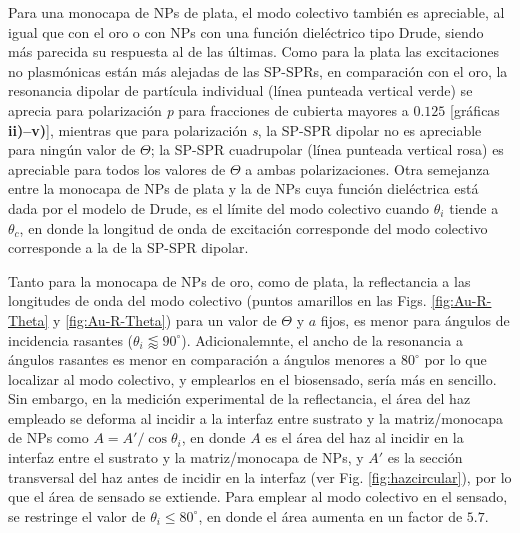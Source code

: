 Para una monocapa de NPs de plata, el modo colectivo también es apreciable, al igual que con el oro o con NPs con una función dieléctrico tipo Drude, siendo más parecida su respuesta al de las últimas. Como para la plata las excitaciones no plasmónicas están más alejadas de las SP-SPRs, en comparación con el oro, la resonancia dipolar de partícula individual (línea punteada vertical verde) se aprecia para polarización \emph{p} para fracciones de cubierta mayores a $0.125$ [gráficas \textbf{ii)--\textbf{v)}}], mientras que para polarización \emph{s}, la SP-SPR dipolar no es apreciable para ningún valor de $\Theta$; la SP-SPR cuadrupolar (línea punteada vertical rosa) es apreciable para todos los valores de $\Theta$ a ambas polarizaciones. Otra semejanza entre la monocapa de NPs de plata y la de NPs cuya función dieléctrica está dada por el modelo de Drude, es el límite del modo colectivo cuando $\theta_i$ tiende a $\theta_c$, en donde la longitud de onda de excitación corresponde del modo colectivo corresponde a la de la SP-SPR dipolar.

Tanto para la monocapa de NPs de oro, como de plata, la reflectancia a las longitudes de onda del modo colectivo (puntos amarillos en las Figs. \ref{fig:Au-R-Theta} y \ref{fig:Au-R-Theta}) para un valor de $\Theta$ y $a$ fijos, es menor para ángulos de incidencia rasantes ($\theta_i\lessapprox 90^\circ$).  Adicionalemnte, el ancho de la resonancia a ángulos rasantes es menor en comparación a ángulos menores a $80^\circ$ por lo que localizar al modo colectivo, y emplearlos en el biosensado, sería más en sencillo. Sin embargo, en la medición experimental de la reflectancia, el área del haz empleado se deforma al incidir a la interfaz entre sustrato y la matriz/monocapa de NPs como $A=A'/\cos\theta_i$, en donde $A$ es el área del haz al incidir en la interfaz entre el sustrato y la matriz/monocapa de NPs, y $A'$ es la sección transversal del haz antes de incidir en la interfaz  (ver Fig. \ref{fig:hazcircular}), por lo que el área de sensado se extiende. Para emplear al modo colectivo en el sensado, se restringe el valor de $\theta_i\leq 80^\circ$, en donde el área aumenta en un factor de $5.7$.


